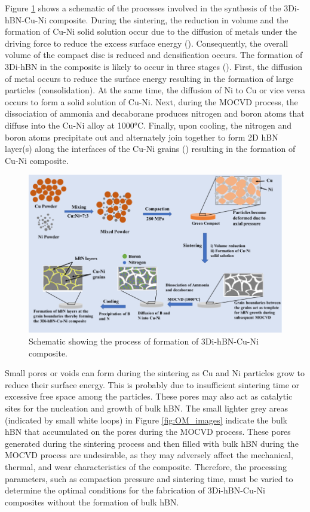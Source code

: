 Figure \ref{fig:Mechanism_of_formation} shows a schematic of the processes involved in the synthesis of the 3Di-hBN-Cu-Ni composite. During the sintering, the reduction in volume and the formation of Cu-Ni solid solution occur due to the diffusion of metals under the driving force to reduce the excess surface energy (\cite{german2010coarsening, mcdonald2017microstructural}). Consequently, the overall volume of the compact disc is reduced and densification occurs. The formation of 3Di-hBN in the composite is likely to occur in three stages (\cite{li2019thermal}). First, the diffusion of metal occurs to reduce the surface energy resulting in the formation of large particles (consolidation). At the same time, the diffusion of Ni to Cu or vice versa occurs to form a solid solution of Cu-Ni. Next, during the MOCVD process, the dissociation of ammonia and decaborane produces nitrogen and boron atoms that diffuse into the Cu-Ni alloy at 1000°C. Finally, upon cooling, the nitrogen and boron atoms precipitate out and alternately join together to form 2D hBN layer(s) along the interfaces of the Cu-Ni grains (\cite{joshi2012boron}) resulting in the formation of Cu-Ni composite.
\begin{figure}[!htb]
\centering
\includegraphics[width=\linewidth]{graphics/chapter_2/Mechanism_of_formation}
\caption{Schematic showing the process of formation of 3Di-hBN-Cu-Ni composite.}
\label{fig:Mechanism_of_formation}
\end{figure}

Small pores or voids can form during the sintering as Cu and Ni particles grow to reduce their surface energy. This is probably due to insufficient sintering time or excessive free space among the particles. These pores may also act as catalytic sites for the nucleation and growth of bulk hBN. The small lighter grey areas (indicated by small white loops) in Figure \ref{fig:OM_images} indicate the bulk hBN that accumulated on the pores during the MOCVD process. These pores generated during the sintering process and then filled with bulk hBN during the MOCVD process are undesirable, as they may adversely affect the mechanical, thermal, and wear characteristics of the composite. Therefore, the processing parameters, such as compaction pressure and sintering time, must be varied to determine the optimal conditions for the fabrication of 3Di-hBN-Cu-Ni composites without the formation of bulk hBN.

